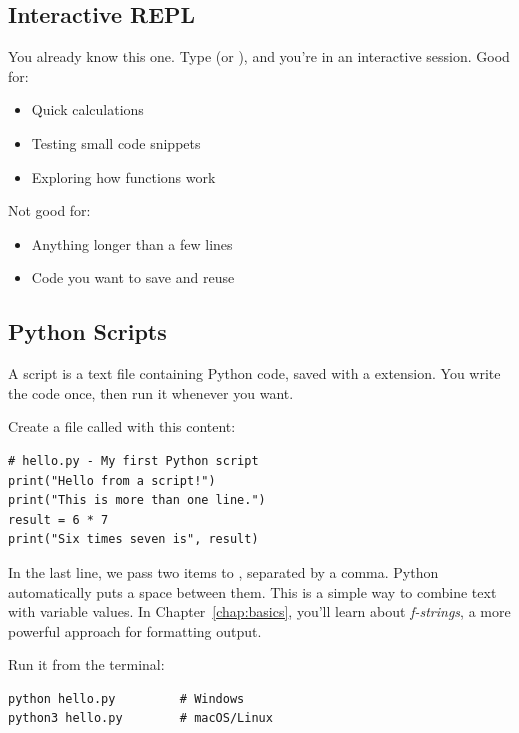 \subsection{Interactive REPL}

You already know this one. Type  (or ), and you're in an interactive session. Good for:
\begin{itemize}
    \item Quick calculations
    \item Testing small code snippets
    \item Exploring how functions work
\end{itemize}

Not good for:
\begin{itemize}
    \item Anything longer than a few lines
    \item Code you want to save and reuse
\end{itemize}

\subsection{Python Scripts}

A script is a text file containing Python code, saved with a  extension. You write the code once, then run it whenever you want.

Create a file called  with this content:

\begin{lstlisting}
# hello.py - My first Python script
print("Hello from a script!")
print("This is more than one line.")
result = 6 * 7
print("Six times seven is", result)
\end{lstlisting}

\begin{note}
In the last line, we pass two items to , separated by a comma. Python automatically puts a space between them. This is a simple way to combine text with variable values. In Chapter~\ref{chap:basics}, you'll learn about \emph{f-strings}, a more powerful approach for formatting output.
\end{note}

Run it from the terminal:

\begin{lstlisting}[style=shellstyle]
python hello.py         # Windows
python3 hello.py        # macOS/Linux
\end{lstlisting}

